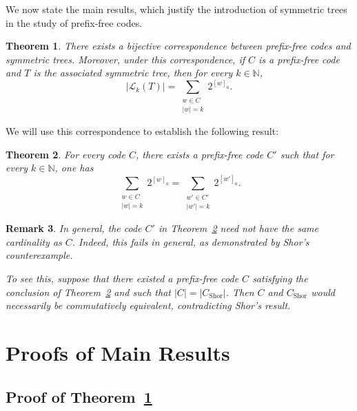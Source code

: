 \documentclass[a4,12pt]{article}%
\newtheorem{theorem}{Theorem}[section]
\newtheorem{remark}[theorem]{Remark}
\begin{document}
We now state the main results, which justify the introduction of symmetric trees in the study of prefix-free codes.

\begin{theorem}\label{theorem:correspondence_symmetric_pfc}
There exists a bijective correspondence between prefix-free codes and symmetric trees. Moreover, under this correspondence, if $C$ is a prefix-free code and $T$ is the associated symmetric tree, then for every $k \in \mathbb{N}$,
\[
\lvert \mathcal{L}_k(T) \rvert
=
\sum_{\substack{w \in C \\ \lvert w \rvert = k}} 2^{[w]_a}.
\]
\end{theorem}

\medskip

We will use this correspondence to establish the following result:

\begin{theorem}\label{theorem:sum_of_powers_equivalence}
For every code $C$, there exists a prefix-free code $C'$ such that for every $k \in \mathbb{N}$, one has
\[
\sum_{\substack{w \in C \\ \lvert w \rvert = k}} 2^{[w]_a}
=
\sum_{\substack{w' \in C' \\ \lvert w' \rvert = k}} 2^{[w']_a}.
\]
\end{theorem}

\begin{remark}\label{remark:not same cardinality}
In general, the code $C'$ in Theorem~\ref{theorem:sum_of_powers_equivalence} need not have the same cardinality as $C$. Indeed, this fails in general, as demonstrated by Shor's counterexample. 

To see this, suppose that there existed a prefix-free code $C$ satisfying the conclusion of Theorem~\ref{theorem:sum_of_powers_equivalence} and such that $\lvert C \rvert = \lvert C_{\mathrm{Shor}} \rvert$. Then $C$ and $C_{\mathrm{Shor}}$ would necessarily be commutatively equivalent, contradicting Shor's result.
\end{remark}



\section{Proofs of Main Results}
\subsection{Proof of Theorem~\ref{theorem:correspondence_symmetric_pfc}}
\end{document}
